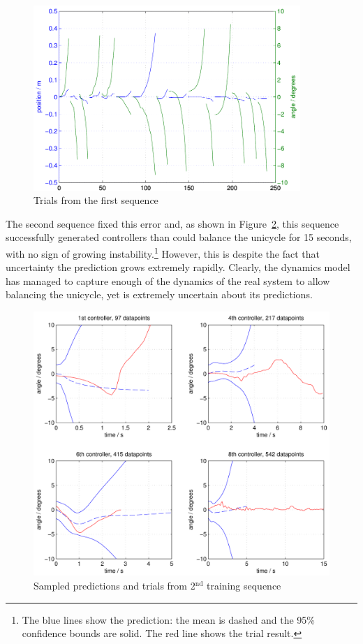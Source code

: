 \documentclass{IIBproject}
\begin{document}
\begin{figure}[htpb]
  \begin{center}
    \includegraphics[height=7cm]{high_dist_loss.pdf}
    \end{center}
    \caption{Trials from the first sequence}
    \label{fig:high_dist_loss}
    \end{figure}

The second sequence fixed this error and, as shown in
Figure~\ref{fig:2nd_sequence}, this sequence successfully generated
controllers than could balance the unicycle for 15 seconds, with no sign of
growing instability.\footnote{The blue lines show the prediction: the mean is
dashed and the 95\% confidence bounds are solid. The red line shows the trial
result.} However, this is despite the fact that uncertainty the prediction
grows extremely rapidly. Clearly, the dynamics model has managed to capture
enough of the dynamics of the real system to allow balancing the unicycle, yet
is extremely uncertain about its predictions.

\begin{figure}[htpb]
  \begin{center}
    \includegraphics[width=13cm]{2nd_sequence.pdf}
    \end{center}
    \caption{Sampled predictions and trials from 2$^\textrm{nd}$ training
    sequence}
    \label{fig:2nd_sequence}
    \end{figure}
\end{document}
